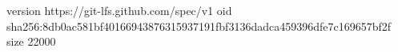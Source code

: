 version https://git-lfs.github.com/spec/v1
oid sha256:8db0ac581bf40166943876315937191fbf3136dadca459396dfe7c169657bf2f
size 22000
